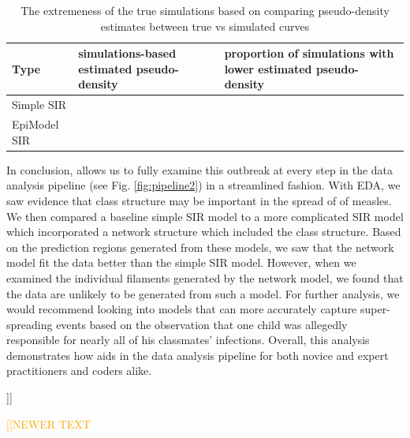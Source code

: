 \documentclass[
  shortnames]{jss}
\begin{document}
\begin{CodeChunk}
\begin{table}[!h]

\caption{\label{tab:hags-extreme}The extremeness of the true simulations based on comparing pseudo-density estimates between true vs simulated curves}
\centering
\begin{tabular}[t]{l>{\raggedleft\arraybackslash}p{6cm}>{\raggedleft\arraybackslash}p{6cm}}
\toprule
Type & simulations-based estimated pseudo-density & proportion of simulations with lower estimated pseudo-density\\
\midrule
Simple SIR & 0.0036733 & 0.00\\
EpiModel SIR & 0.0118283 & 0.03\\
\bottomrule
\end{tabular}
\end{table}

\end{CodeChunk}

In conclusion,  allows us to fully examine this outbreak
at every step in the data analysis pipeline (see Fig.
\ref{fig:pipeline2}) in a streamlined fashion. With EDA, we saw evidence
that class structure may be important in the spread of of measles. We
then compared a baseline simple SIR model to a more complicated SIR
model which incorporated a network structure which included the class
structure. Based on the prediction regions generated from these models,
we saw that the network model fit the data better than the simple SIR
model. However, when we examined the individual filaments generated by
the network model, we found that the data are unlikely to be generated
from such a model. For further analysis, we would recommend looking into
models that can more accurately capture super-spreading events based on
the observation that one child was allegedly responsible for nearly all
of his classmates' infections. Overall, this analysis demonstrates how
 aids in the data analysis pipeline for both novice and
expert practitioners and coders alike.

{]}{]}

\textcolor{orange}{[[NEWER TEXT}
\end{document}
